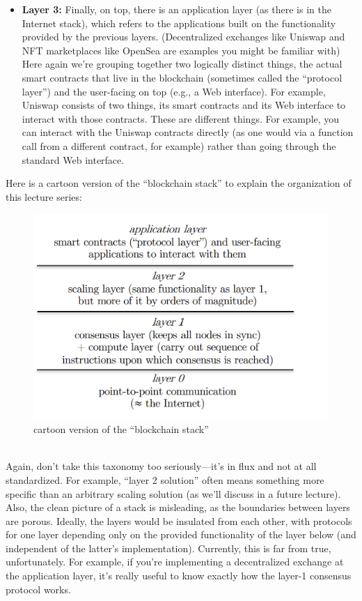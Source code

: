 \begin{itemize}
    \item \textbf{Layer 3:} Finally, on top, there is an application layer (as there is in the Internet stack), which
    refers to the applications built on the functionality provided by the previous layers.
    (Decentralized exchanges like Uniswap and NFT marketplaces like OpenSea are examples you might be familiar with) Here again we’re grouping together two logically
    distinct things, the actual smart contracts that live in the blockchain (sometimes called the “protocol layer”) and the user-facing on top (e.g., a Web interface). For example, Uniswap consists of two things, its smart contracts and its Web interface to interact
    with those contracts. These are different things. For example, you can interact with the
    Uniswap contracts directly (as one would via a function call from a different contract,
    for example) rather than going through the standard Web interface.
\end{itemize}

Here is a cartoon version of the “blockchain stack” to explain the organization of this
lecture series:
\begin{figure}[h]
    \centering
    \includegraphics[scale = 0.7]{figures/f1.png}
    \caption{cartoon version of the “blockchain stack”}
    \label{fig:mesh1}
\end{figure}\\

Again, don’t take this taxonomy too seriously—it’s in flux and not at all standardized. For
example, “layer 2 solution” often means something more specific than an arbitrary scaling
solution (as we’ll discuss in a future lecture). Also, the clean picture of a stack is misleading,
as the boundaries between layers are porous. Ideally, the layers would be insulated from
each other, with protocols for one layer depending only on the provided functionality of
the layer below (and independent of the latter’s implementation). Currently, this is far
from true, unfortunately. For example, if you’re implementing a decentralized exchange at
the application layer, it’s really useful to know exactly how the layer-1 consensus protocol
works.


